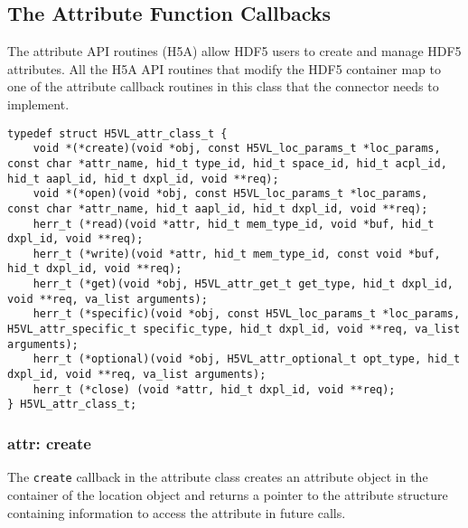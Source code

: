
\subsection{The Attribute Function Callbacks}
The attribute API routines (H5A) allow HDF5 users to create and manage
HDF5 attributes. All the H5A API routines that modify the HDF5
container map to one of the attribute callback routines in this
class that the connector needs to implement.

\begin{lstlisting}[caption={Structure for attribute callback routines, H5VLconnector.h}, captionpos=b, label={lst:ATTRclass}]
typedef struct H5VL_attr_class_t {                                               
    void *(*create)(void *obj, const H5VL_loc_params_t *loc_params, const char *attr_name, hid_t type_id, hid_t space_id, hid_t acpl_id, hid_t aapl_id, hid_t dxpl_id, void **req);
    void *(*open)(void *obj, const H5VL_loc_params_t *loc_params, const char *attr_name, hid_t aapl_id, hid_t dxpl_id, void **req);
    herr_t (*read)(void *attr, hid_t mem_type_id, void *buf, hid_t dxpl_id, void **req);
    herr_t (*write)(void *attr, hid_t mem_type_id, const void *buf, hid_t dxpl_id, void **req);
    herr_t (*get)(void *obj, H5VL_attr_get_t get_type, hid_t dxpl_id, void **req, va_list arguments);
    herr_t (*specific)(void *obj, const H5VL_loc_params_t *loc_params, H5VL_attr_specific_t specific_type, hid_t dxpl_id, void **req, va_list arguments);            
    herr_t (*optional)(void *obj, H5VL_attr_optional_t opt_type, hid_t dxpl_id, void **req, va_list arguments); 
    herr_t (*close) (void *attr, hid_t dxpl_id, void **req);                     
} H5VL_attr_class_t; 
\end{lstlisting}

\subsubsection{attr: create}
The \texttt{create} callback in the attribute class creates an
attribute object in the container of the location object and
returns a pointer to the attribute structure containing information to
access the attribute in future calls. \bigskip

